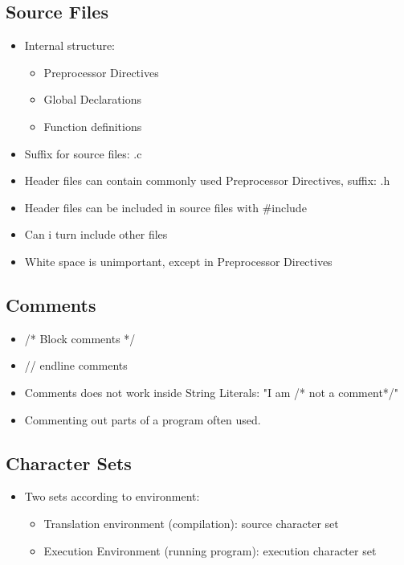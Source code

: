 \documentclass[a4wide,10pt]{article}
\begin{document}
		\subsection{Source Files} %
		\label{sub:source_files}
			\begin{itemize}
				\item Internal structure:
					\begin{itemize}
						\item Preprocessor Directives
						\item Global Declarations
						\item Function definitions
					\end{itemize}
				\item Suffix for source files: .c
				\item Header files can contain commonly used Preprocessor Directives, suffix: .h
				\item Header files can be included in source files with \#include
				\item Can i turn include other files
				\item White space is unimportant, except in Preprocessor Directives
			\end{itemize}
		
		\subsection{Comments} %
		\label{sub:comments}
			\begin{itemize}
				\item /* Block comments */
				\item // endline comments
				\item Comments does not work inside String Literals: "I am /* not a comment*/"
				\item Commenting out parts of a program often used.
			\end{itemize}
		
		\subsection{Character Sets} %
		\label{sub:character_sets}
			\begin{itemize}
				\item Two sets according to environment:
					\begin{itemize}
						\item Translation environment (compilation): source character set
						\item Execution Environment (running program): execution character set
					\end{itemize}
			\end{itemize}
		
\end{document}
